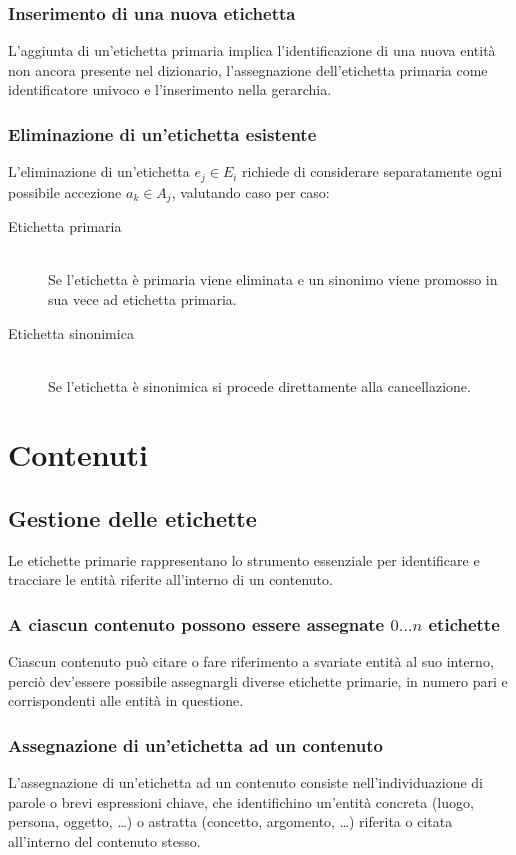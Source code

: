 \documentclass[10pt,a4paper,headinclude,footinclude,hidelinks]{scrreprt} %
\begin{document}
	\subsubsection{Inserimento di una nuova etichetta}
	L'aggiunta di un'etichetta primaria implica l'identificazione di una nuova entità non ancora presente nel dizionario, l'assegnazione dell'etichetta primaria come identificatore univoco e l'inserimento nella gerarchia.

	\subsubsection{Eliminazione di un'etichetta esistente}
	L'eliminazione di un'etichetta $e_j \in E_i$ richiede di considerare separatamente ogni possibile accezione $a_k \in A_j$, valutando caso per caso:
	\begin{description}
	\item[Etichetta primaria]\hfill \\
	Se l'etichetta è primaria viene eliminata e un sinonimo viene promosso in sua vece ad etichetta primaria.
 	\item[Etichetta sinonimica] \hfill \\
	Se l'etichetta è sinonimica si procede direttamente alla cancellazione.
	\end{description}

	\section{Contenuti}
	\label{sec:stage:req:contenuti}

	\subsection{Gestione delle etichette}
	Le etichette primarie rappresentano lo strumento essenziale per identificare e tracciare le entità riferite all'interno di un contenuto.

	\subsubsection{A ciascun contenuto possono essere assegnate $0\ldots n$ etichette}
	Ciascun contenuto può citare o fare riferimento a svariate entità al suo interno, perciò dev'essere possibile assegnargli diverse etichette primarie, in numero pari e corrispondenti alle entità in questione.

	\subsubsection{Assegnazione di un'etichetta ad un contenuto}
	L'assegnazione di un'etichetta ad un contenuto consiste nell'individuazione di parole o brevi espressioni chiave, che identifichino un'entità concreta (luogo, persona, oggetto, \ldots) o astratta (concetto, argomento, \ldots) riferita o citata all'interno del contenuto stesso.
	
\end{document}
